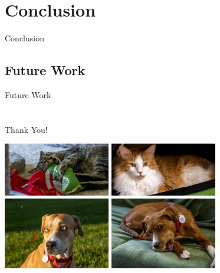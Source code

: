 \documentclass[xcolor=dvipsnames, aspectratio=169]{beamer}
\begin{document}
\section{Conclusion}
\begin{frame}{Conclusion}

\end{frame}

\subsection{Future Work}
\begin{frame}{Future Work}

\end{frame}

\section{}
\begin{frame}{Thank You!}
\begin{center}
\noindent \includegraphics[width=0.35\textwidth]{101_IMG_0236 (1) - 2x1 - Compressed.jpg}
\noindent \includegraphics[width=0.35\textwidth]{101_IMG_0330 (1) - 2x1 - Compressed.jpg}\\
\vspace{0.04in}
\noindent \includegraphics[width=0.35\textwidth]{101_IMG_0941 (1) - Compressed.jpg}
\noindent \includegraphics[width=0.35\textwidth]{101_IMG_0756 (1) - Compressed.jpg}\\
\end{center}
\end{frame}
\end{document}
